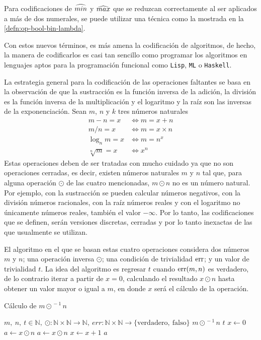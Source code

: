 Para codificaciones de $ \widehat{min} $ y $ \widehat{max} $ que se reduzcan correctamente al ser aplicados a más de dos numerales, se puede utilizar una técnica como la mostrada en la \autoref{defn:op-bool-bin-lambda}.

Con estos nuevos términos, es más amena la codificación de algoritmos, de hecho, la manera de codificarlos es casi tan sencillo como programar los algoritmos en lenguajes aptos para la programación funcional como \texttt{Lisp}, \texttt{ML} o \texttt{Haskell}.

La estrategia general para la codificación de las operaciones faltantes se basa en la observación de que la sustracción es la función inversa de la adición, la división es la función inversa de la multiplicación y el logaritmo y la raíz son las inversas de la exponenciación. Sean $ m $, $ n $ y $ k $ tres números naturales
\begin{align*}
  m-n = x &\iff m = x+n \\
  m/n = x &\iff m = x\times n\\
  \log_{n}m = x &\iff m = n^{x} \\
  \sqrt[n]m = x &\iff x^{n}
\end{align*}
Estas operaciones deben de ser tratadas con mucho cuidado ya que no son operaciones cerradas, es decir, existen números naturales $ m $ y $ n $ tal que, para alguna operación $ \odot $ de las cuatro mencionadas, $ m \odot n $ no es un número natural. Por ejemplo, con la sustracción se pueden calcular números negativos, con la división números racionales, con la raíz números reales y con el logaritmo no únicamente números reales, también el valor $ -\infty $. Por lo tanto, las codificaciones que se definen, serán versiones discretas, cerradas y por lo tanto inexactas de las que usualmente se utilizan.

El algoritmo en el que se basan estas cuatro operaciones considera dos números $ m $ y $ n $; una operación inversa $ \odot $; una condición de trivialidad $ {\rm err} $; y un valor de trivialidad $ t $. La idea del algoritmo es regresar $ t $ cuando $ {\rm err}(m,n) $ es verdadero, de lo contrario iterar a partir de $ x = 0 $, calculando el resultado $ x \odot n $ hasta obtener un valor mayor o igual a $ m $, en donde $ x $ será el cálculo de la operación.

\begin{algorithm}
  \caption{Cálculo de $ m \odot^{\, -1} n $}
  \label{alg:inversas}
  \begin{algorithmic}
    \REQUIRE $ m,\ n,\ t \in \mathbb{N},\ \odot \colon \mathbb{N} \times \mathbb{N} \to \mathbb{N},\ err \colon \mathbb{N} \times \mathbb{N} \to \{ \mathrm{verdadero},\ \mathrm{falso} \} $
    \ENSURE $ m \odot^{\, -1} n $
    \RETURN $ t $
    \ELSE
    \STATE $ x \leftarrow 0 $
    \STATE $ a \leftarrow x \odot n $
    \STATE $ a \leftarrow x \odot n $
    \STATE $ x \leftarrow x + 1 $
    \ENDWHILE
    \RETURN $ a $
    \ENDIF
  \end{algorithmic}
\end{algorithm}

